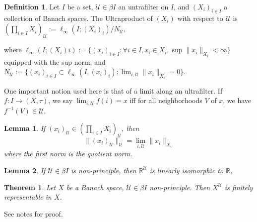 \documentclass[11pt, reqno]{article}
\theoremstyle{plain}
\newtheorem*{theorem}{Theorem}
\newtheorem*{lemma}{Lemma}
\theoremstyle{definition}
\newtheorem*{definition}{Definition}
\theoremstyle{remark}
\newcommand{\RR}{\mathbb{R}}
\begin{document}
\begin{definition}
    Let $I$ be a set, $\mathcal{U} \in \beta I$ an untrafilter on $I$, and $(X_i)_{i \in I}$ a collection
    of Banach spaces. The Ultraproduct of $(X_i)$ with respect to $\mathcal{U}$ is 
    $(\prod_{i \in I} X_i)_{\mathcal{U}} := \ell_\infty(I; (X_i)_i)/N_\mathcal{U}$, 

    where $\ell_\infty(I; (X_i)i) := \{(x_i)_{i \in I}: \forall i \in I, x_i \in X_i, \sup \|x_i\|_{X_i} < \infty\}$
    equipped with the sup norm, and $N_\mathcal{U} := \{(x_i)_{i \in I} \subset \ell_\infty(I, (x_i)_i):
    \lim_{i, \mathcal{U}} \|x_i\|_{X_i} = 0\}$.
\end{definition}

One important notion used here is that of a limit along an ultrafilter. If $f:I \rightarrow (X,\tau)$,
we say $\lim_{i, \mathcal{U}} f(i) = x$ iff for all neighborhoods $V$ of $x$, we have $f^{-1}(V) \in \mathcal{U}$.

\begin{lemma}
    If $(x_i)_\mathcal{U} \in (\prod_{i \in I} X_i)_\mathcal{U}$, then 
    \[
        \|(x_i)_\mathcal{U}\|_\mathcal{U} = \lim_{i, \mathcal{U}}\|x_i\|_{X_i}
    \]
    where the first norm is the quotient norm.
\end{lemma}

\begin{lemma}
    If $\mathcal{U} \in \beta I$ is non-principle, then $\RR^{\mathcal{U}}$ is linearly isomorphic
    to $\RR$. 
\end{lemma}

\begin{theorem}
    Let $X$ be a Banach space, $\mathcal{U} \in \beta I$ non-principle. Then $X^{\mathcal{U}}$ is finitely 
    representable in $X$.
\end{theorem}

See notes for proof.
\end{document}
